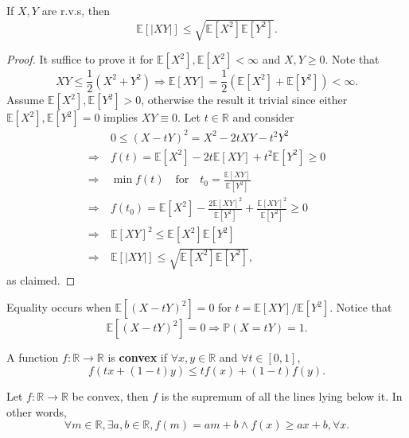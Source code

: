 \begin{proposition}\label{prop:Cauchy-Schwartz inequality}
    If $X,Y$ are r.v.s, then 
    \[
        \mathbb{E}[|XY|]\le \sqrt{\mathbb{E}[X^2]\mathbb{E}[Y^2]}.
    \]
\end{proposition}
\begin{proof}
    It suffice to prove it for $ \mathbb{E}[X^2],\mathbb{E}[X^2]<\infty $ and $ X,Y\ge 0 $. Note that 
    \[
        XY\le \frac{1}{2}(X^2+Y^2) \Longrightarrow \mathbb{E}[XY] = \frac{1}{2}\left( \mathbb{E}[X^2]+\mathbb{E}[Y^2] \right)<\infty .
    \]
    Assume $ \mathbb{E}[X^2],\mathbb{E}[Y^2]>0 $, otherwise the result it trivial since either $ \mathbb{E}[X^2],\mathbb{E}[Y^2]=0 $ implies $XY\equiv 0$. Let $t\in \mathbb{R}$ and consider 
    \begin{align*}
        &\ 0\le (X-tY)^2 = X^2-2tXY-t^2Y^2\\ 
        \Longrightarrow &\  f(t) = \mathbb{E}[X^2]-2t\mathbb{E}[XY]+t^2\mathbb{E}[Y^2]\ge 0\\ 
        \Longrightarrow &\  \min f(t)\quad\text{for}\quad t_0 = \frac{\mathbb{E}[XY]}{\mathbb{E}[Y^2]} \\ 
        \Longrightarrow &\  f(t_0)=\mathbb{E}[X^2]-\frac{2\mathbb{E}[XY]^2}{\mathbb{E}[Y^2]}+\frac{\mathbb{E}[XY]^2}{\mathbb{E}[Y^2]}\ge 0\\ 
        \Longrightarrow &\  \mathbb{E}[XY]^2\le \mathbb{E}[X^2]\mathbb{E}[Y^2]\\ 
        \Longrightarrow &\  \mathbb{E}[|XY|]\le \sqrt{\mathbb{E}[X^2]\mathbb{E}[Y^2]},
    \end{align*}
    as claimed.
\end{proof}
\begin{remark}
    Equality occurs when $ \mathbb{E}[(X-tY)^2]=0 $ for $ t=\mathbb{E}[XY]/\mathbb{E}[Y^2] $. Notice that 
    \[
        \mathbb{E}[(X-tY)^2]=0 \Longrightarrow \mathbb{P}(X=tY)=1.
    \]
\end{remark}
\begin{definition}
    A function $ f:\mathbb{R} \to \mathbb{R} $ is \textbf{convex} if $ \forall x,y\in \mathbb{R}  $ and $ \forall t\in [0,1] $,
    \[
        f(tx+(1-t)y)\le tf(x)+(1-t)f(y).
    \]
\end{definition}
\begin{lemma}\label{lma:Jensen}
    Let $ f:\mathbb{R} \to \mathbb{R}  $ be convex, then $f$ is the supremum of all the lines lying below it. In other words,
    \[
        \forall m\in \mathbb{R}, \exists a,b\in \mathbb{R}, f(m)=am+b \land f(x)\ge ax+b,\forall x.
    \]
\end{lemma}
